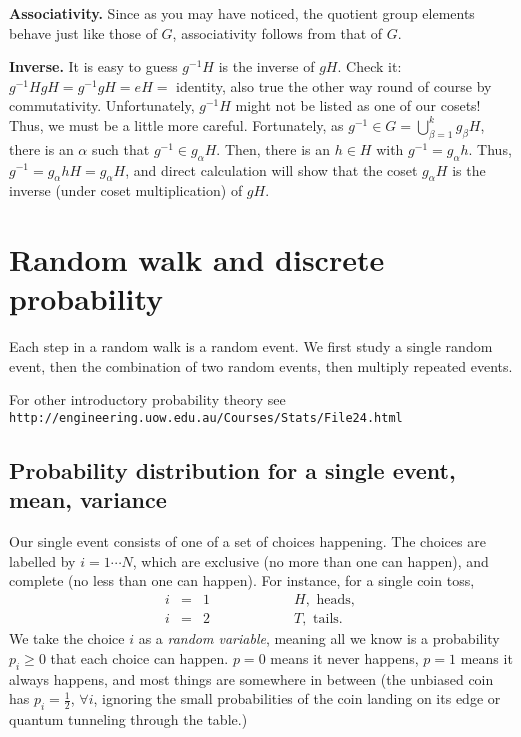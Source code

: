 \documentclass[12pt,letterpaper]{report}
\newcommand\bea{\begin{eqnarray}}
\newcommand\eea{\end{eqnarray}}
\begin{document}
{\bf Associativity.} Since as you may have noticed, the quotient
group elements behave just like those of $G$, associativity
follows from that of $G$.

{\bf Inverse.} It is easy to guess $g^{-1} H$ is the inverse of $g
H$. Check it: $g^{-1} H g H = g^{-1} g H = eH = $ identity, also
true the other way round of course by commutativity.
Unfortunately, $g^{-1} H$ might not be listed as one of our
cosets! Thus, we must be a little more careful. Fortunately, as
$g^{-1} \in G = \bigcup_{\beta=1}^k g_\beta H$, there is an
$\alpha$ such that $g^{-1} \in g_\alpha H$. Then, there is an $h
\in H$ with $g^{-1} = g_\alpha h$. Thus, $g^{-1} = g_\alpha h H =
g_\alpha H$, and direct calculation will show that the coset
$g_\alpha H$ is the inverse (under coset multiplication) of $g H$.





\section{Random walk and discrete probability}

Each step in a random walk is a random event. We first study a
single random event, then the combination of two random events,
then multiply repeated events.

For other introductory probability theory see\newline
\verb+http://engineering.uow.edu.au/Courses/Stats/File24.html+

\subsection{Probability distribution for a single event, mean, variance}

Our single event consists of one of a set of choices happening.
The choices are labelled by $i = 1\cdots N$, which are exclusive
(no more than one can happen), and complete (no less than one can
happen). For instance, for a single coin toss, \bea
i& =& 1 \hspace{1in} H , \mbox{ heads}, \nonumber \\
i&=&2 \hspace{1in} T, \mbox{ tails}. \nonumber \eea We take the
choice $i$ as a {\em random variable}, meaning all we know is a
probability $p_i \ge 0$ that each choice can happen. $p=0$ means
it never happens, $p=1$ means it always happens, and most things
are somewhere in between (the unbiased coin has $p_i=\frac{1}{2}$,
$\forall i$, ignoring the small probabilities of the coin landing
on its edge or quantum tunneling through the table.)
\end{document}
